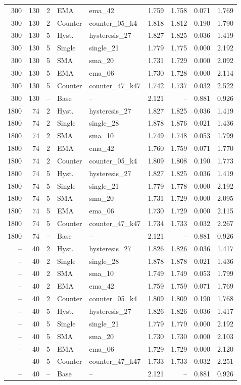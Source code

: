 {\begin{longtable}{rrlllrrrr}
300 & 130 & 2 & EMA & ema\_42 & 1.759 & 1.758 & 0.071 & 1.769\\
300 & 130 & 2 & Counter & counter\_05\_k4 & 1.818 & 1.812 & 0.190 & 1.790\\
300 & 130 & 5 & Hyst. & hysteresis\_27 & 1.827 & 1.825 & 0.036 & 1.419\\
300 & 130 & 5 & Single & single\_21 & 1.779 & 1.775 & 0.000 & 2.192\\
300 & 130 & 5 & SMA & sma\_20 & 1.731 & 1.729 & 0.000 & 2.092\\
300 & 130 & 5 & EMA & ema\_06 & 1.730 & 1.728 & 0.000 & 2.114\\
300 & 130 & 5 & Counter & counter\_47\_k47 & 1.742 & 1.737 & 0.032 & 2.522\\
300 & 130 & -- & Base & -- & 2.121 & -- & 0.881 & 0.926\\
1800 & 74 & 2 & Hyst. & hysteresis\_27 & 1.827 & 1.825 & 0.036 & 1.419\\
1800 & 74 & 2 & Single & single\_28 & 1.878 & 1.876 & 0.021 & 1.436\\
1800 & 74 & 2 & SMA & sma\_10 & 1.749 & 1.748 & 0.053 & 1.799\\
1800 & 74 & 2 & EMA & ema\_42 & 1.760 & 1.759 & 0.071 & 1.770\\
1800 & 74 & 2 & Counter & counter\_05\_k4 & 1.809 & 1.808 & 0.190 & 1.773\\
1800 & 74 & 5 & Hyst. & hysteresis\_27 & 1.827 & 1.825 & 0.036 & 1.419\\
1800 & 74 & 5 & Single & single\_21 & 1.779 & 1.778 & 0.000 & 2.192\\
1800 & 74 & 5 & SMA & sma\_20 & 1.731 & 1.729 & 0.000 & 2.095\\
1800 & 74 & 5 & EMA & ema\_06 & 1.730 & 1.729 & 0.000 & 2.115\\
1800 & 74 & 5 & Counter & counter\_47\_k47 & 1.734 & 1.733 & 0.032 & 2.267\\
1800 & 74 & -- & Base & -- & 2.121 & -- & 0.881 & 0.926\\
-- & 40 & 2 & Hyst. & hysteresis\_27 & 1.826 & 1.826 & 0.036 & 1.417\\
-- & 40 & 2 & Single & single\_28 & 1.878 & 1.878 & 0.021 & 1.436\\
-- & 40 & 2 & SMA & sma\_10 & 1.749 & 1.749 & 0.053 & 1.799\\
-- & 40 & 2 & EMA & ema\_42 & 1.759 & 1.759 & 0.071 & 1.769\\
-- & 40 & 2 & Counter & counter\_05\_k4 & 1.809 & 1.809 & 0.190 & 1.768\\
-- & 40 & 5 & Hyst. & hysteresis\_27 & 1.826 & 1.826 & 0.036 & 1.417\\
-- & 40 & 5 & Single & single\_21 & 1.779 & 1.779 & 0.000 & 2.192\\
-- & 40 & 5 & SMA & sma\_20 & 1.730 & 1.730 & 0.000 & 2.103\\
-- & 40 & 5 & EMA & ema\_06 & 1.729 & 1.729 & 0.000 & 2.120\\
-- & 40 & 5 & Counter & counter\_47\_k47 & 1.733 & 1.733 & 0.032 & 2.251\\
-- & 40 & -- & Base & -- & 2.121 & -- & 0.881 & 0.926\\
\end{longtable}}
